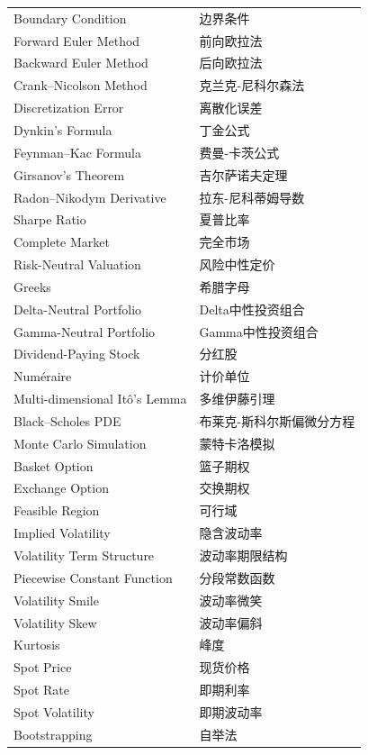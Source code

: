 \begin{longtable}{ll}
    Boundary Condition & 边界条件 \\
    Forward Euler Method & 前向欧拉法 \\
    Backward Euler Method & 后向欧拉法 \\
    Crank--Nicolson Method & 克兰克-尼科尔森法 \\
    Discretization Error & 离散化误差 \\
    Dynkin's Formula & 丁金公式 \\
    Feynman--Kac Formula & 费曼-卡茨公式 \\
    Girsanov's Theorem & 吉尔萨诺夫定理 \\
    Radon--Nikodym Derivative & 拉东-尼科蒂姆导数 \\
    Sharpe Ratio & 夏普比率 \\
    Complete Market & 完全市场 \\
    Risk-Neutral Valuation & 风险中性定价 \\
    Greeks & 希腊字母 \\
    Delta-Neutral Portfolio & Delta中性投资组合 \\
    Gamma-Neutral Portfolio & Gamma中性投资组合 \\
    Dividend-Paying Stock & 分红股 \\
    Num\'eraire & 计价单位 \\
    Multi-dimensional It\^o's Lemma & 多维伊藤引理 \\
    Black--Scholes PDE & 布莱克-斯科尔斯偏微分方程 \\
    Monte Carlo Simulation & 蒙特卡洛模拟 \\
    Basket Option & 篮子期权 \\
    Exchange Option & 交换期权 \\
    Feasible Region & 可行域 \\
    Implied Volatility & 隐含波动率 \\
    Volatility Term Structure & 波动率期限结构 \\
    Piecewise Constant Function & 分段常数函数 \\
    Volatility Smile & 波动率微笑 \\
    Volatility Skew & 波动率偏斜 \\
    Kurtosis & 峰度 \\
    Spot Price & 现货价格 \\
    Spot Rate & 即期利率 \\
    Spot Volatility & 即期波动率 \\
    Bootstrapping & 自举法 \\

\end{longtable}
